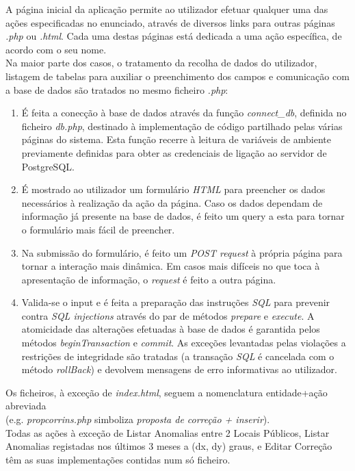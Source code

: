 \documentclass[12pt]{report}
\begin{document}
    \normalsize
    \vspace{2mm}

    \hspace*{1em}
    A página inicial da aplicação permite ao utilizador efetuar qualquer uma das ações especificadas no enunciado, através de diversos links para outras páginas \textit{.php} ou \textit{.html}. Cada uma destas páginas está dedicada a uma ação específica, de acordo com o seu nome. \\

    \hspace*{1em} Na maior parte dos casos, o tratamento da recolha de dados do utilizador, listagem de tabelas para auxiliar o preenchimento dos campos e comunicação com a base de dados são tratados no mesmo ficheiro \textit{.php}:
    \\
    \begin{enumerate}
        \item É feita a conecção à base de dados através da função \textit{connect\_db}, definida no ficheiro \textit{db.php}, destinado à implementação de código partilhado pelas várias páginas do sistema. Esta função recerre à leitura de variáveis de ambiente previamente definidas para obter as credenciais de ligação ao servidor de PostgreSQL.
        \item É mostrado ao utilizador um formulário \textit{HTML} para preencher os dados necessários à realização da ação da página. Caso os dados dependam de informação já presente na base de dados, é feito um query a esta para tornar o formulário mais fácil de preencher.
        \item Na submissão do formulário, é feito um \textit{POST request} à própria página para tornar a interação mais dinâmica. Em casos mais difíceis no que toca à apresentação de informação, o \textit{request} é feito a outra página.
        \item Valida-se o input e é feita a preparação das instruções \textit{SQL} para prevenir contra \textit{SQL injections} através do par de métodos \textit{prepare} e \textit{execute}. A atomicidade das alterações efetuadas à base de dados é garantida pelos métodos \textit{beginTransaction} e \textit{commit}. As exceções levantadas pelas violações a restrições de integridade são tratadas (a transação \textit{SQL} é cancelada com o método \textit{rollBack}) e devolvem mensagens de erro informativas ao utilizador.
    \end{enumerate}
    \hspace*{1em}
    Os ficheiros, à exceção de \textit{index.html}, seguem a nomenclatura entidade+ação abreviada \\ (e.g. \textit{propcorrins.php} simboliza \textit{proposta de correção + inserir}). \\
    \hspace*{1em}
    Todas as ações à exceção de Listar Anomalias entre 2 Locais Públicos, Listar Anomalias registadas nos últimos 3 meses a (dx, dy) graus, e Editar Correção têm as suas implementações contidas num só ficheiro.


\end{document}
